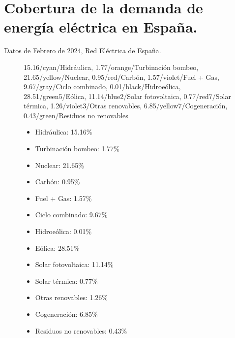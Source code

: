 \section{Cobertura de la demanda de energía eléctrica en España.}
	Datos de Febrero de 2024, Red Eléctrica de España.
	\begin{figure}[H]
		\centering
		\begin{minipage}{.6\textwidth}
			\donutchart
			{
				15.16/cyan/Hidráulica,
				1.77/orange/Turbinación bombeo,
				21.65/yellow/Nuclear,
				0.95/red/Carbón,
				1.57/violet/Fuel + Gas,
				9.67/gray/Ciclo combinado,
				0.01/black/Hidroeólica,
				28.51/green5/Eólica,
				11.14/blue2/Solar fotovoltaica,
				0.77/red7/Solar térmica,
				1.26/violet3/Otras renovables,
				6.85/yellow7/Cogeneración,
				0.43/green/Residuos no renovables
			}
		\end{minipage}%
		\begin{minipage}{.4\textwidth}
			\begin{itemize}
				\item[\textcolor{cyan}    {\rule{1em}{1em}}] Hidráulica: 15.16\%
				\item[\textcolor{orange}  {\rule{1em}{1em}}] Turbinación bombeo: 1.77\%
				\item[\textcolor{yellow}  {\rule{1em}{1em}}] Nuclear: 21.65\%
				\item[\textcolor{red}     {\rule{1em}{1em}}] Carbón: 0.95\%
				\item[\textcolor{violet}  {\rule{1em}{1em}}] Fuel + Gas: 1.57\%
				\item[\textcolor{gray}    {\rule{1em}{1em}}] Ciclo combinado: 9.67\%
				\item[\textcolor{black}   {\rule{1em}{1em}}] Hidroeólica: 0.01\%
				\item[\textcolor{green5}  {\rule{1em}{1em}}] Eólica: 28.51\%
				\item[\textcolor{blue2}   {\rule{1em}{1em}}] Solar fotovoltaica: 11.14\%
				\item[\textcolor{red7}    {\rule{1em}{1em}}] Solar térmica: 0.77\%
				\item[\textcolor{violet3} {\rule{1em}{1em}}] Otras renovables: 1.26\%
				\item[\textcolor{yellow7} {\rule{1em}{1em}}] Cogeneración: 6.85\%
				\item[\textcolor{green}   {\rule{1em}{1em}}] Residuos no renovables: 0.43\%
			\end{itemize}
		\end{minipage}
	\end{figure}
	
